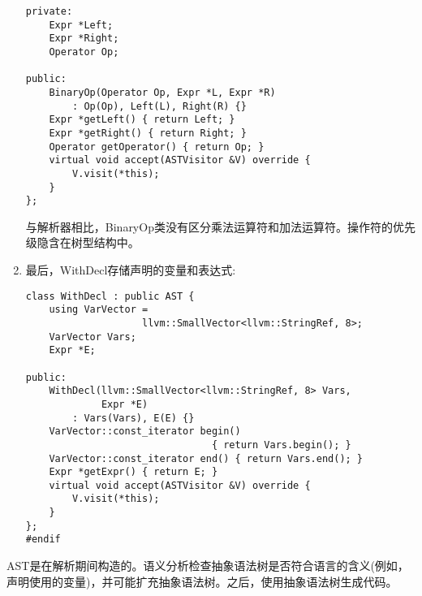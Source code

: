 \begin{enumerate}
\begin{lstlisting}[caption={}]
private:
	Expr *Left;
	Expr *Right;
	Operator Op;
	
public:
	BinaryOp(Operator Op, Expr *L, Expr *R)
		: Op(Op), Left(L), Right(R) {}
	Expr *getLeft() { return Left; }
	Expr *getRight() { return Right; }
	Operator getOperator() { return Op; }
	virtual void accept(ASTVisitor &V) override {
		V.visit(*this);
	}
};	
\end{lstlisting}
与解析器相比，BinaryOp类没有区分乘法运算符和加法运算符。操作符的优先级隐含在树型结构中。

\item 最后，WithDecl存储声明的变量和表达式:
\begin{lstlisting}[caption={}]
class WithDecl : public AST {
	using VarVector =
					llvm::SmallVector<llvm::StringRef, 8>;
	VarVector Vars;
	Expr *E;
	
public:
	WithDecl(llvm::SmallVector<llvm::StringRef, 8> Vars,
			 Expr *E)
		: Vars(Vars), E(E) {}
	VarVector::const_iterator begin()
								{ return Vars.begin(); }
	VarVector::const_iterator end() { return Vars.end(); }
	Expr *getExpr() { return E; }
	virtual void accept(ASTVisitor &V) override {
		V.visit(*this);
	}
};
#endif	
\end{lstlisting}

\end{enumerate}

AST是在解析期间构造的。语义分析检查抽象语法树是否符合语言的含义(例如，声明使用的变量)，并可能扩充抽象语法树。之后，使用抽象语法树生成代码。
